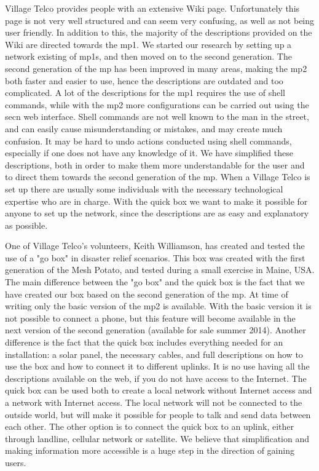 Village Telco provides people with an extensive Wiki page. Unfortunately this page is not very well structured and can seem very confusing, as well as not being user friendly. In addition to this, the majority of the descriptions provided on the Wiki are directed towards the \gls{mp1}. We started our research by setting up a network existing of \glspl{mp1}, and then moved on to the second generation. The second generation of the \gls{mp} has been improved in many areas, making the \gls{mp2} both faster and easier to use, hence the descriptions are outdated and too complicated. A lot of the descriptions for the \gls{mp1} requires the use of shell commands, while with the \gls{mp2} more configurations can be carried out using the \gls{secn} web interface. Shell commands are not well known to the man in the street, and can easily cause misunderstanding or mistakes, and may create much confusion. It may be hard to undo actions conducted using shell commands, especially if one does not have any knowledge of it. We have simplified these descriptions, both in order to make them more understandable for the user and to direct them towards the second generation of the \gls{mp}. When a Village Telco is set up there are usually some individuals with the necessary technological expertise who are in charge. With the \gls{quick} box we want to make it possible for anyone to set up the network, since the descriptions are as easy and explanatory as possible. 

One of Village Telco's volunteers, Keith Williamson, has created and tested the use of a "go box" in disaster relief scenarios. This box was created with the first generation of the Mesh Potato, and tested during a small exercise in Maine, USA. The main difference between the "go box" and the \gls{quick} box is the fact that we have created our box based on the second generation of the \gls{mp}. At time of writing only the basic version of the \gls{mp2} is available. With the basic version it is not possible to connect a phone, but this feature will become available in the next version of the second generation (available for sale summer 2014). Another difference is the fact that the \gls{quick} box includes everything needed for an installation: a solar panel, the necessary cables, and full descriptions on how to use the box and how to connect it to different uplinks. It is no use having all the descriptions available on the web, if you do not have access to the Internet. The \gls{quick} box can be used both to create a local network without Internet access and a network with Internet access. The local network will not be connected to the outside world, but will make it possible for people to talk and send data between each other. The other option is to connect the \gls{quick} box to an uplink, either through landline, cellular network or satellite. We believe that simplification and making information more accessible is a huge step in the direction of gaining users. 

